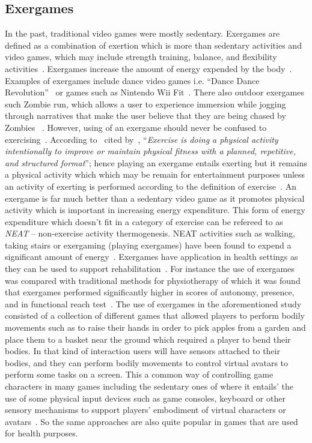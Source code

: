 \subsection{Exergames}
In the past, traditional video games were mostly sedentary. Exergames are defined as a combination of exertion which is more than sedentary activities and video games, which may include strength training, balance, and flexibility activities~\citep{oh2010defining}. Exergames increase the amount of energy expended by the body~\citep{graves2010physiological}. Examples of exergames include  dance video games i.e. ``Dance Dance Revolution''~\citep{lieberman2006dance} or games such as Nintendo Wii Fit~\citep{gobel2010serious}. There also outdoor exergames such Zombie run, which allows a user to experience immersion while jogging through narratives that make the user believe that they are being chased by Zombies ~\citep{southerton2013zombies}. However, using of an exergame should never be confused to exercising~\citep{oh2010defining}. According to~\cite[p. 126]{caspersen1985physical} cited by~\cite{oh2010defining}, ``\emph{Exercise is doing a physical activity intentionally to improve or maintain physical fitness with a planned, repetitive, and structured format}''; hence playing an exergame entails exerting but it remains a physical activity which which may be remain for entertainment purposes unless an activity of exerting is performed according to the definition of exercise~\citep{oh2010defining}. An exergame is far much better than a sedentary video game as it promotes physical activity which is important in increasing energy expenditure. This form of energy expenditure which doesn't fit in a category of exercise can be refereed to as \emph{NEAT} -- non-exercise activity thermogenesis. NEAT activities such as walking, taking stairs or exergaming (playing exergames) have been found to expend a significant amount of energy~\citep{fujiki2008neat}. Exergames have application in health settings as they can be used to support rehabilitation~\citep{mccallum2012gamification}. For instance the use of exergames was compared with traditional methods for physiotherapy of which it was found that exergames performed significantly higher in scores of autonomy, presence, and in functional reach test~\citep{smeddinck2015exergames}. The use of exergames in the aforementioned study consisted of a collection of different games that allowed players to perform bodily movements such as to raise their hands in order to pick apples from a garden and place them to a basket near the ground which required a player to bend their bodies. In that kind of interaction users will have sensors attached to their bodies, and they can perform bodily movements to control virtual avatars to perform some tasks on a screen. This a common way of controlling game characters in many games including the sedentary ones of where it entails' the use of some physical input devices such as game consoles, keyboard or other sensory mechanisms to support players' embodiment of virtual characters or avatars~\citep{berkovsky2012physical}. So the same approaches are also quite popular in games that are used for health purposes. 

